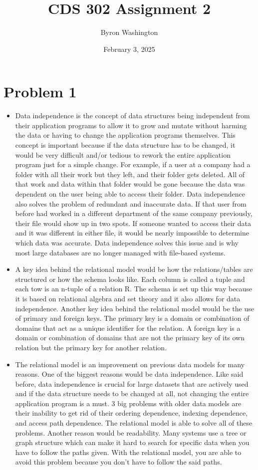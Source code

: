 \documentclass{article}
\title{CDS 302 Assignment 2}
\author{Byron Washington}
\date{February 3, 2025}
\begin{document}
\maketitle
\section*{Problem 1} \label{part1}
\begin{itemize}
    \item Data independence is the concept of data structures being independent from their application programs to allow it to grow and mutate without harming the data or having to change the application programs themselves. This concept is important because if the data structure has to be changed, it would be very difficult and/or tedious to rework the entire application program just for a simple change. For example, if a user at a company had a folder with all their work but they left, and their folder gets deleted. All of that work and data within that folder would be gone because the data was dependent on the user being able to access their folder. Data independence also solves the problem of redundant and inaccurate data. If that user from before had worked in a different department of the same company previously, their file would show up in two spots. If someone wanted to access their data and it was different in either file, it would be nearly impossible to determine which data was accurate. Data independence solves this issue and is why most large databases are no longer managed with file-based systems.
    \item A key idea behind the relational model would be how the relations/tables are structured or how the schema looks like. Each column is called a tuple and each tow is an n-tuple of a relation R. The schema is set up this way because it is based on relational algebra and set theory and it also allows for data independence. Another key idea behind the relational model would be the use of primary and foreign keys. The primary key is a domain or combination of domains that act as a unique identifier for the relation. A foreign key is a domain or combination of domains that are not the primary key of its own relation but the primary key for another relation.
    \item The relational model is an improvement on previous data models for many reasons. One of the biggest reasons would be data independence. Like said before, data independence is crucial for large datasets that are actively used and if the data structure needs to be changed at all, not changing the entire application program is a must. 3 big problems with older data models are their inability to get rid of their ordering dependence, indexing dependence, and access path dependence. The relational model is able to solve all of these problems. Another reason would be readability. Many systems use a tree or graph structure which can make it hard to search for specific data when you have to follow the paths given. With the relational model, you are able to avoid this problem because you don’t have to follow the said paths. 
\end{itemize}
\end{document}
